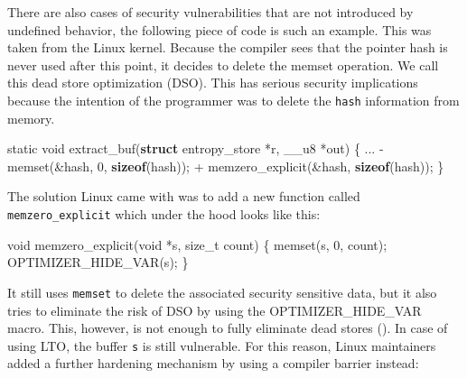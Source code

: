 \documentclass[
  a4paper,
]{report}
\newenvironment{Shaded}{}{}
\newcommand{\DataTypeTok}[1]{\textcolor[rgb]{0.56,0.13,0.00}{#1}}
\newcommand{\DecValTok}[1]{\textcolor[rgb]{0.25,0.63,0.44}{#1}}
\newcommand{\KeywordTok}[1]{\textcolor[rgb]{0.00,0.44,0.13}{\textbf{#1}}}
\newcommand{\NormalTok}[1]{#1}
\newcommand{\OperatorTok}[1]{\textcolor[rgb]{0.40,0.40,0.40}{#1}}
\begin{document}
There are also cases of security vulnerabilities that are not introduced
by undefined behavior, the following piece of code is such an example.
This was taken from the Linux kernel. Because the compiler sees that the
pointer hash is never used after this point, it decides to delete the
memset operation. We call this
\label{__index_entry_182}{dead store optimization
(DSO)}. This has serious security
implications because the intention of the programmer was to delete the
\texttt{hash} information from memory.

\begin{Shaded}
\begin{Highlighting}[]
\DataTypeTok{static} \DataTypeTok{void}\NormalTok{ extract\_buf}\OperatorTok{(}\KeywordTok{struct}\NormalTok{ entropy\_store }\OperatorTok{*}\NormalTok{r}\OperatorTok{,}\NormalTok{ \_\_u8 }\OperatorTok{*}\NormalTok{out}\OperatorTok{)} \OperatorTok{\{}
  \OperatorTok{...}
  \OperatorTok{{-}}\NormalTok{ memset}\OperatorTok{(\&}\NormalTok{hash}\OperatorTok{,} \DecValTok{0}\OperatorTok{,} \KeywordTok{sizeof}\OperatorTok{(}\NormalTok{hash}\OperatorTok{));}
  \OperatorTok{+}\NormalTok{ memzero\_explicit}\OperatorTok{(\&}\NormalTok{hash}\OperatorTok{,} \KeywordTok{sizeof}\OperatorTok{(}\NormalTok{hash}\OperatorTok{));}
\OperatorTok{\}}
\end{Highlighting}
\end{Shaded}

The solution Linux came with was to add a new function called
\texttt{memzero\_explicit} which under the hood looks like this:

\begin{Shaded}
\begin{Highlighting}[]
\DataTypeTok{void}\NormalTok{ memzero\_explicit}\OperatorTok{(}\DataTypeTok{void} \OperatorTok{*}\NormalTok{s}\OperatorTok{,} \DataTypeTok{size\_t}\NormalTok{ count}\OperatorTok{)}
\OperatorTok{\{}
\NormalTok{  memset}\OperatorTok{(}\NormalTok{s}\OperatorTok{,} \DecValTok{0}\OperatorTok{,}\NormalTok{ count}\OperatorTok{);}
\NormalTok{  OPTIMIZER\_HIDE\_VAR}\OperatorTok{(}\NormalTok{s}\OperatorTok{);}
\OperatorTok{\}}
\end{Highlighting}
\end{Shaded}

It still uses
\label{__index_entry_183}{\texttt{memset}}
to delete the associated security sensitive data, but it also tries to
eliminate the risk of DSO by using the OPTIMIZER\_HIDE\_VAR macro. This,
however, is not enough to fully eliminate dead stores
(). In case of using LTO, the
buffer \texttt{s} is still vulnerable. For this reason, Linux
maintainers added a further hardening mechanism by using a compiler
barrier instead:
\end{document}
